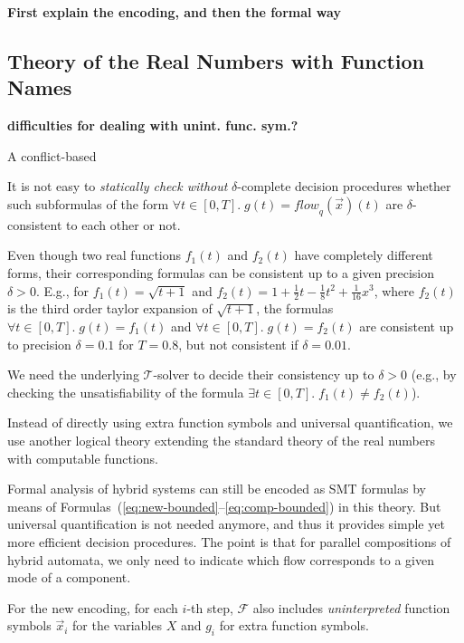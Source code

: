 \textbf{First explain the encoding, and then the formal way}


\subsection{Theory of the Real Numbers with Function Names}


\textbf{difficulties for dealing with unint. func. sym.?}

A conflict-based 

It is not easy to \emph{statically check without} $\delta$-complete decision procedures
whether such subformulas of the form $\forall t \in [0,T].\; g(t) = \mathit{flow}_q(\vec{x})(t)$
are $\delta$-consistent to each other or not.

Even though two real functions
$f_1(t)$ and $f_2(t)$ have completely different forms, 
their corresponding formulas 
can be consistent up to a given precision $\delta > 0$.
E.g.,
for $f_1(t) = \sqrt{t+1}$ and $f_2(t) = 1 + \frac{1}{2}t - \frac{1}{8}t^2 + \frac{1}{16}x^3$,
where $f_2(t)$ is the third order taylor expansion of $\sqrt{t+1}$,
the formulas 
$\forall t \in [0,T].\; g(t) = f_1(t)$ and  $\forall t \in [0,T].\; g(t) = f_2(t)$
are consistent up to precision $\delta = 0.1$ for $T = 0.8$,
but not consistent if  $\delta = 0.01$.

We need the underlying $\mathcal{T}$-solver
to decide their consistency up to $\delta > 0$
(e.g., by checking the unsatisfiability of the formula
$\exists t \in [0,T].\; f_1(t) \neq f_2(t)$).


%



Instead of directly using extra function symbols and universal quantification,
we use another logical theory 
extending the standard theory of the real numbers with computable functions.

Formal analysis of hybrid systems
can still be encoded as SMT formulas by means of Formulas~(\ref{eq:new-bounded}--\ref{eq:comp-bounded})
in this theory.
But universal quantification is not needed anymore,
and thus it provides simple yet more efficient decision procedures.
%
The point is that for parallel compositions of hybrid automata,
 we only need to indicate which flow corresponds to a given mode of a component.





For the new encoding, %
for each $i$-th step,
$\mathcal{F}$ also includes \emph{uninterpreted} function symbols
$\vec{x}_i$ for the variables $X$
and $g_i$ for extra function symbols.

